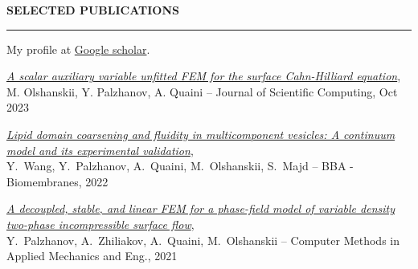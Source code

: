 \documentclass[10pt,letterpaper]{letter}
\newcommand{\gsect}[1]{\textcolor{codepurple}{\textbf{{\Large \uppercase{#1} }}} \\ \hrule}
\begin{document}
\gsect{Selected publications}
My profile at \href{https://scholar.google.com/citations?user=OCklKaMAAAAJ&hl=en}{Google scholar}. 
\begin{etaremune}
	\item \textsl{\href{https://doi.org/10.1007/s10915-023-02370-8}{A scalar auxiliary variable unfitted FEM for the surface Cahn-Hilliard equation}},\\ M. Olshanskii, Y. Palzhanov, A. Quaini -- Journal of Scientific Computing, Oct 2023
	\item \textsl{\href{https://doi.org/10.1016/j.bbamem.2022.183898}{Lipid domain coarsening and fluidity in multicomponent vesicles: A continuum model and its experimental validation}},\\ Y.~Wang, Y.~Palzhanov, A.~Quaini, M.~Olshanskii, S.~Majd -- BBA - Biomembranes, 2022	
	\item \textsl{\href{https://www.sciencedirect.com/science/article/abs/pii/S0045782521004989}{A decoupled, stable, and linear FEM for a phase-field model of variable density two-phase incompressible surface flow}},\\ Y.~Palzhanov, A.~Zhiliakov, A.~Quaini, M.~Olshanskii -- 
	Computer Methods in Applied Mechanics and Eng., 2021
\end{etaremune}

\end{document}
